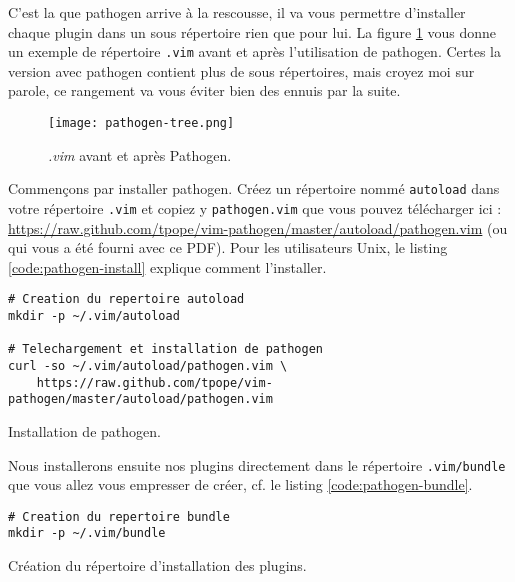 C'est la que pathogen arrive à la rescousse, il va vous permettre d'installer chaque plugin dans un sous répertoire rien que pour lui. La figure \ref{fig:pathogen-tree} vous donne un exemple de répertoire \Verb|.vim| avant et après l'utilisation de pathogen. Certes la version avec pathogen contient plus de sous répertoires, mais croyez moi sur parole, ce rangement va vous éviter bien des ennuis par la suite.

\begin{figure}%
  \texttt{[image: pathogen-tree.png]}
  \caption{\emph{.vim} avant et après Pathogen.}
  \label{fig:pathogen-tree}
\end{figure}

Commençons par installer pathogen. Créez un répertoire nommé \Verb|autoload| dans votre répertoire \Verb|.vim| et copiez y \Verb|pathogen.vim| que vous pouvez télécharger ici : \url{https://raw.github.com/tpope/vim-pathogen/master/autoload/pathogen.vim} (ou qui vous a été fourni avec ce PDF). Pour les utilisateurs Unix, le listing \ref{code:pathogen-install} explique comment l'installer.

\begin{listing}[H]
\begin{verbatim}
# Creation du repertoire autoload
mkdir -p ~/.vim/autoload 

# Telechargement et installation de pathogen
curl -so ~/.vim/autoload/pathogen.vim \
    https://raw.github.com/tpope/vim-pathogen/master/autoload/pathogen.vim
\end{verbatim}
  \caption{Installation de pathogen.}
  \label{code:pathogen-install}
\end{listing}

Nous installerons ensuite nos plugins directement dans le répertoire \Verb|.vim/bundle| que vous allez vous empresser de créer, cf. le listing \ref{code:pathogen-bundle}.

\begin{listing}[H]
\begin{verbatim}
# Creation du repertoire bundle
mkdir -p ~/.vim/bundle
\end{verbatim}
  \caption{Création du répertoire d'installation des plugins.}
  \label{code:pathogen-bundle}
\end{listing}


